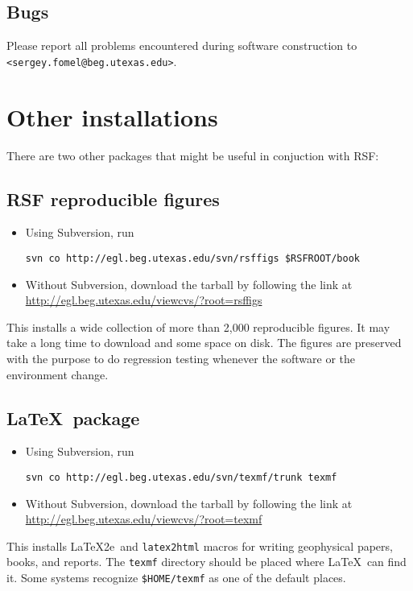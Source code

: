 \subsection{Bugs}

Please report all problems encountered during software construction to \\
\texttt{<sergey.fomel@beg.utexas.edu>}.

\section{Other installations}

There are two other packages that might be useful in conjuction with RSF:

\subsection{RSF reproducible figures}

\begin{itemize}
\item Using Subversion, run
\begin{verbatim}
svn co http://egl.beg.utexas.edu/svn/rsffigs $RSFROOT/book
\end{verbatim}
\item Without Subversion, download the tarball by following the link at
\url{http://egl.beg.utexas.edu/viewcvs/?root=rsffigs}
\end{itemize}
This installs a wide collection of more than 2,000 reproducible
figures. It may take a long time to download and some space on disk.
The figures are preserved with the purpose to do regression testing
whenever the software or the environment change.

\subsection{\LaTeX\ package}

\begin{itemize}
\item Using Subversion, run
\begin{verbatim}
svn co http://egl.beg.utexas.edu/svn/texmf/trunk texmf
\end{verbatim}
\item Without Subversion, download the tarball by following the link at
  \url{http://egl.beg.utexas.edu/viewcvs/?root=texmf}
\end{itemize}
This installs \LaTeX2e\ and \texttt{latex2html} macros for writing
geophysical papers, books, and reports. The \texttt{texmf} directory should
be placed where \LaTeX\ can find it. Some systems recognize
\texttt{\$HOME/texmf} as one of the default places.

%

